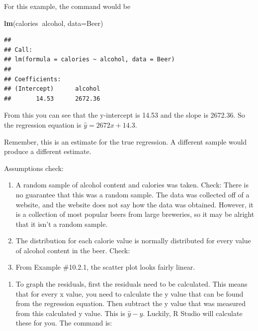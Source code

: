 \documentclass[
]{book}
\newenvironment{Shaded}{\begin{snugshade}}{\end{snugshade}}
\newcommand{\DataTypeTok}[1]{\textcolor[rgb]{0.13,0.29,0.53}{#1}}
\newcommand{\KeywordTok}[1]{\textcolor[rgb]{0.13,0.29,0.53}{\textbf{#1}}}
\newcommand{\NormalTok}[1]{#1}
\newcommand{\OperatorTok}[1]{\textcolor[rgb]{0.81,0.36,0.00}{\textbf{#1}}}
\providecommand{\tightlist}{%
  \setlength{\itemsep}{0pt}\setlength{\parskip}{0pt}}
\begin{document}
For this example, the command would be

\begin{Shaded}
\begin{Highlighting}[]
\KeywordTok{lm}\NormalTok{(calories}\OperatorTok{~}\NormalTok{alcohol, }\DataTypeTok{data=}\NormalTok{Beer)}
\end{Highlighting}
\end{Shaded}

\begin{verbatim}
## 
## Call:
## lm(formula = calories ~ alcohol, data = Beer)
## 
## Coefficients:
## (Intercept)      alcohol  
##       14.53      2672.36
\end{verbatim}

From this you can see that the y-intercept is 14.53 and the slope is 2672.36. So the regression equation is \(\hat{y}=2672x+14.3\).

Remember, this is an estimate for the true regression. A different sample would produce a different estimate.

Assumptions check:

\begin{enumerate}
\def\labelenumi{\alph{enumi}.}
\item
  A random sample of alcohol content and calories was taken. Check: There is no guarantee that this was a random sample. The data was collected off of a website, and the website does not say how the data was obtained. However, it is a collection of most popular beers from large breweries, so it may be alright that it isn't a random sample.
\item
  The distribution for each calorie value is normally distributed for every value of alcohol content in the beer. Check:
\item
  From Example \#10.2.1, the scatter plot looks fairly linear.
\end{enumerate}

\begin{enumerate}
\def\labelenumi{\roman{enumi}.}
\setcounter{enumi}{1}
\tightlist
\item
  To graph the residuals, first the residuals need to be calculated. This means that for every x value, you need to calculate the y value that can be found from the regression equation. Then subtract the y value that was measured from this calculated y value. This is \(\hat{y}-y\). Luckily, R Studio will calculate these for you. The command is:
\end{enumerate}
\end{document}
